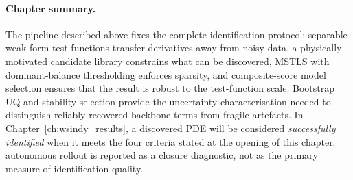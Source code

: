 \paragraph{Chapter summary.}
The pipeline described above fixes the complete identification protocol:
separable weak-form test functions transfer derivatives away from noisy
data, a physically motivated candidate library constrains what can be
discovered, MSTLS with dominant-balance thresholding enforces sparsity,
and composite-score model selection ensures that the result is robust to
the test-function scale.  Bootstrap UQ and stability selection provide
the uncertainty characterisation needed to distinguish reliably recovered
backbone terms from fragile artefacts.  In
Chapter~\ref{ch:wsindy_results}, a discovered PDE will be considered
\emph{successfully identified} when it meets the four criteria stated at
the opening of this chapter; autonomous rollout is reported as a closure
diagnostic, not as the primary measure of identification quality.
